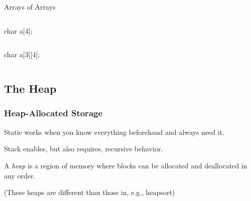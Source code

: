 \documentclass{plt}
\begin{document}
\begin{frame}[fragile]{Arrays of Arrays}
\begin{columns}
  \begin{column}{0.3\textwidth}
\begin{C}
char a[4];
\end{C}
  \end{column}
  \begin{column}{0.7\textwidth}
  \end{column}
\end{columns}

\vspace{3pc}

\begin{columns}
  \begin{column}{0.3\textwidth}
\begin{C}
char a[3][4];
\end{C}
  \end{column}
  \begin{column}{0.7\textwidth}
  \end{column}
\end{columns}
\end{frame}

\subsection{The Heap}

\begin{frame}
  \frametitle{Heap-Allocated Storage}

Static works when you know everything beforehand and always need it.

Stack enables, but also requires, recursive behavior.

A \emph{heap} is a region of memory where blocks can be allocated and
deallocated in any order.

(These heaps are different than those in, e.g., heapsort)

\end{frame}
\end{document}
